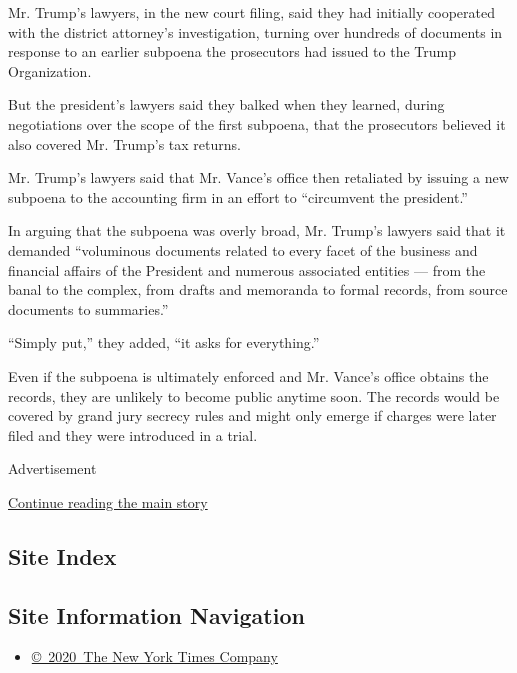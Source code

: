Mr. Trump's lawyers, in the new court filing, said they had initially
cooperated with the district attorney's investigation, turning over
hundreds of documents in response to an earlier subpoena the prosecutors
had issued to the Trump Organization.

But the president's lawyers said they balked when they learned, during
negotiations over the scope of the first subpoena, that the prosecutors
believed it also covered Mr. Trump's tax returns.

Mr. Trump's lawyers said that Mr. Vance's office then retaliated by
issuing a new subpoena to the accounting firm in an effort to
``circumvent the president.''

In arguing that the subpoena was overly broad, Mr. Trump's lawyers said
that it demanded ``voluminous documents related to every facet of the
business and financial affairs of the President and numerous associated
entities --- from the banal to the complex, from drafts and memoranda to
formal records, from source documents to summaries.''

``Simply put,'' they added, ``it asks for everything.''

Even if the subpoena is ultimately enforced and Mr. Vance's office
obtains the records, they are unlikely to become public anytime soon.
The records would be covered by grand jury secrecy rules and might only
emerge if charges were later filed and they were introduced in a trial.

Advertisement

\protect\hyperlink{after-bottom}{Continue reading the main story}

\hypertarget{site-index}{%
\subsection{Site Index}\label{site-index}}

\hypertarget{site-information-navigation}{%
\subsection{Site Information
Navigation}\label{site-information-navigation}}

\begin{itemize}
\tightlist
\item
  \href{https://help.nytimes3xbfgragh.onion/hc/en-us/articles/115014792127-Copyright-notice}{©~2020~The
  New York Times Company}
\end{itemize}

